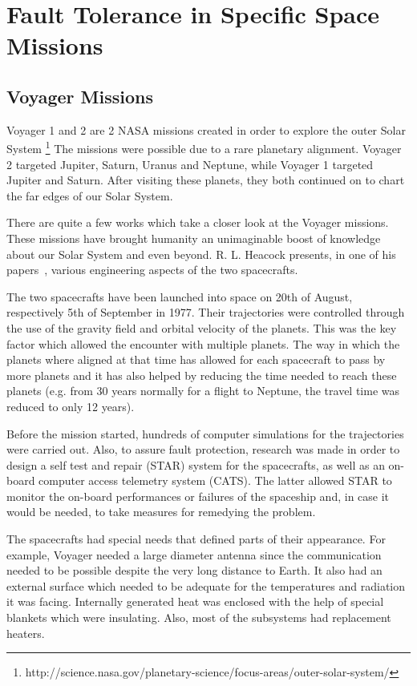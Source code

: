 \section{Fault Tolerance in Specific Space Missions}
\subsection{Voyager Missions}

Voyager 1 and 2 \cite{vo1-nasa}\cite{vo2-nasa} are 2 NASA missions created in
order to explore the outer Solar System
\footnote{http://science.nasa.gov/planetary-science/focus-areas/outer-solar-system/}
The missions were possible due to a rare planetary alignment. Voyager 2 targeted
Jupiter, Saturn, Uranus and Neptune, while Voyager 1 targeted Jupiter and
Saturn. After visiting these planets, they both continued on to chart the far
edges of our Solar System.

There are quite a few works which take a closer look at the Voyager missions.
These missions have brought humanity an unimaginable boost of knowledge about
our Solar System and even beyond. R. L. Heacock presents, in one of his
papers~\cite{tvs}, various engineering aspects of the two spacecrafts.

The two spacecrafts have been launched into space on 20th of August,
respectively 5th of September in 1977. Their trajectories were controlled
through the use of the gravity field and orbital velocity of the planets. This
was the key factor which allowed the encounter with multiple planets. The way in
which the planets where aligned at that time has allowed for each spacecraft to
pass by more planets and it has also helped by reducing the time needed to reach
these planets (e.g. from 30 years normally for a flight to Neptune, the travel
time was reduced to only 12 years).

Before the mission started, hundreds of computer simulations for the
trajectories were carried out. Also, to assure fault protection, research was
made in order to design a self test and repair (STAR) system for the
spacecrafts, as well as an on-board computer access telemetry system (CATS). The
latter allowed STAR to monitor the on-board performances or failures of the
spaceship and, in case it would be needed, to take measures for remedying the
problem.

The spacecrafts had special needs that defined parts of their appearance.
For example, Voyager needed a large diameter antenna since the communication
needed to be possible despite the very long distance to Earth. It also had an
external surface which needed to be adequate for the temperatures and radiation
it was facing. Internally generated heat was enclosed with the help of special
blankets which were insulating. Also, most of the subsystems had replacement
heaters.

